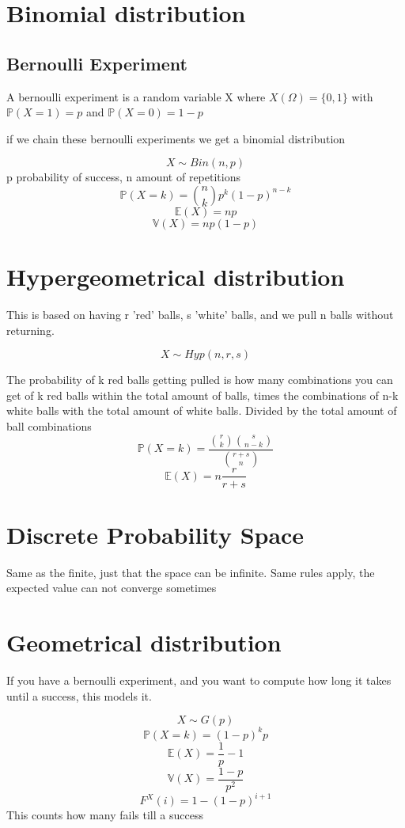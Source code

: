 \documentclass{article}
\begin{document}
\section{Binomial distribution}
\subsection{Bernoulli Experiment}
A bernoulli experiment is a random variable X where $X(\Omega) = \{0,1\}$ with $\mathbb{P}(X = 1) = p$ and $\mathbb{P}(X = 0) = 1-p$  

if we chain these bernoulli experiments we get a binomial distribution


\[X \sim Bin(n,p)\]
p probability of success, n amount of repetitions
\[\mathbb{P}(X =k ) = \binom{n}{k}p^k(1-p)^{n-k}\]
\[\mathbb{E}(X) = np\]
\[\mathbb{V}(X) = np(1-p)\]
\section{Hypergeometrical distribution}
This is based on having r 'red' balls, s 'white' balls, and we pull n balls without returning. 

\[X \sim Hyp(n,r,s)\]

The probability of k red balls getting pulled is how many combinations you can get of k red balls within the total amount of balls, times the combinations of n-k white balls with the total amount of white balls. Divided by the total amount of ball combinations 
\[\mathbb{P}(X=k) = \frac{\binom{r}{k} \binom{s}{n-k}}{\binom{r+s}{n}}\]
\[\mathbb{E}(X) = n\frac{r}{r+s}\]

\section{Discrete Probability Space}
Same as the finite, just that the space can be infinite. Same rules apply, the expected value can not converge sometimes

\section{Geometrical distribution}

If you have a bernoulli experiment, and you want to compute how long it takes until a success, this models it.

\[X \sim G(p)\]
\[\mathbb{P}(X=k) = (1-p)^kp\]
\[\mathbb{E}(X) = \frac{1}{p}-1\]
\[\mathbb{V}(X) = \frac{1-p}{p^2}\]
\[F^X(i) = 1-(1-p)^{i+1}\]
This counts how many fails till a success
\end{document}
